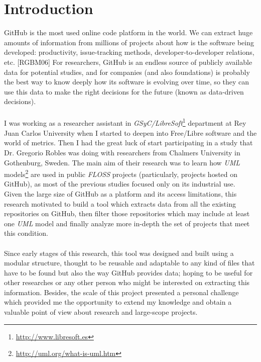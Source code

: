 \documentclass[a4paper, 12pt]{book}
\begin{document}

\cleardoublepage
\chapter{Introduction}
\label{sec:intro} %
GitHub is the most used online code platform in the world. We can extract huge amounts of information from millions of projects
about how is the software being developed: productivity, issue-tracking methods, developer-to-developer relations, etc. [RGBM06]
For researchers, GitHub is an endless source of publicly available data for potential studies, and for companies (and also foundations)
is probably the best way to know deeply how its software is evolving over time, so they can use this data to make the right decisions
for the future (known as data-driven decisions).\\\\
I was working as a researcher assistant in \emph{GSyC/LibreSoft}\footnote{\url{http://www.libresoft.es}} department at Rey Juan Carlos University when I started to
deepen into Free/Libre software and the world of metrics. Then I had the great luck of start participating in a study that
Dr. Gregorio Robles was doing with researchers from Chalmers University in Gothenburg, Sweden. The main aim of their research was to
learn how \emph{UML} models\footnote{\url{http://uml.org/what-is-uml.htm}} are used in public \emph{FLOSS} projects (particularly, projects hosted on GitHub),
as most of the previous studies focused only on its industrial use.\\
Given the large size of GitHub as a platform and its access limitations, this research motivated to build a tool which extracts
data from all the existing repositories on GitHub, then filter those repositories which may include at least one
\emph{UML} model and finally analyze more in-depth the set of projects that meet this condition.\\\\
Since early stages of this research, this tool was designed and built using a modular structure, thought to be reusable
and adaptable to any kind of files that have to be found but also the way GitHub provides data; hoping to be useful
for other researches or any other person who might be interested on extracting this information. Besides, the scale of this project
presented a personal challenge which provided me the opportunity to extend my knowledge and obtain a valuable point of
view about research and large-scope projects.
\end{document}
